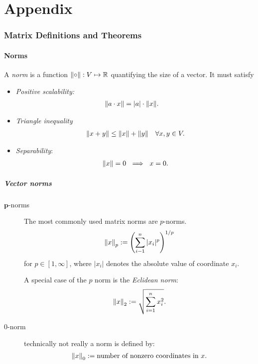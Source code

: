 \newpage
\appendix
 
\part{Appendix}
\section{Matrix Definitions and Theorems}
\subsection{Norms}
A \emph{norm} is a function $\left\lVert\circ\right\rVert: V \mapsto \mathbb{R}$ quantifying the size of a vector. It must satisfy
\begin{itemize}
    \item \emph{Positive scalability:}
    \begin{align*}
        \norm{a\cdot x} &= |a|\cdot \norm{x}.
    \end{align*}
    \item \emph{Triangle inequality}
    \begin{align*}
        \norm{x+y} \leq \norm{x} + \norm{y} \quad \forall x,y \in V.
    \end{align*}
    \item \emph{Separability}:
    \begin{align*}
        \left\lVert x\right\rVert = 0 \ \implies \ x=0.
    \end{align*}
\end{itemize}
\subsubsection{Vector norms}
\begin{description}
    \item[$\mathbf{p}$-norms] The most commonly used matrix norms are $p$-norms.
        \begin{align*}
            \left\lVert x\right\rVert_p := \left(\sum_{i-1}^n |x_i|^p\right)^{1/p}
        \end{align*}
        for $p \in [1,\infty]$, where $|x_i|$ denotes the absolute value of coordinate $x_i$.
        
        A special case of the $p$ norm is the \emph{Eclidean norm}:
        \begin{align*}
            \left\lVert x\right\rVert_2:= \sqrt{\sum_{i=1}^n x_i^2}.
        \end{align*}
    \item[$0$-norm] technically not really a norm is defined by:
        \begin{align*}
            \left\lVert x\right\rVert_0 := \text{number of nonzero coordinates in $x$}.
        \end{align*}
\end{description}
